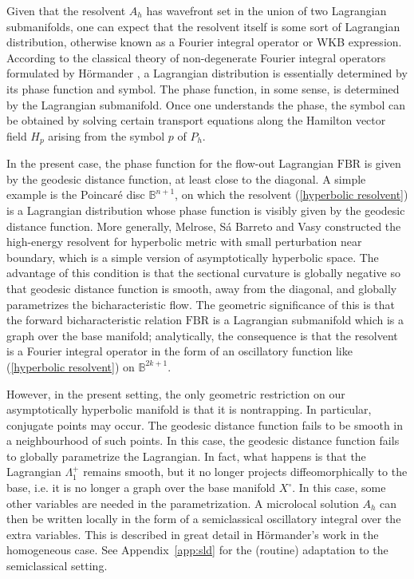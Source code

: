 \documentclass[10pt, a4paper, twoside]{amsart}
\numberwithin{equation}{section}
\theoremstyle{remark}
\begin{document}
Given that the resolvent $A_h$ has wavefront set in the union of two Lagrangian submanifolds, one can expect that the resolvent itself is some sort of Lagrangian distribution, otherwise known as a Fourier integral operator or WKB expression. According to the classical theory of non-degenerate Fourier integral operators formulated by H\"{o}rmander \cite{Hormander-Acta-1971}, a Lagrangian distribution is essentially determined by its phase function and symbol. The phase function, in some sense, is determined by the Lagrangian submanifold. Once one understands the phase, the symbol can be obtained by solving certain transport equations along the Hamilton vector field $H_p$ arising from the symbol $p$ of $P_h$.

In the present case, the phase function for the flow-out Lagrangian ${\mathrm{FBR}}$ is given by the geodesic distance function, at least close to the diagonal.  A simple example is the Poincar\'e disc $\mathbb{B}^{n + 1}$, on which the resolvent (\ref{hyperbolic resolvent}) is a Lagrangian distribution whose phase function is visibly given by the geodesic distance function. More generally, Melrose, S\'{a} Barreto and Vasy \cite{Melrose-Sa Barreto-Vasy} constructed the high-energy resolvent for hyperbolic metric with small perturbation near boundary, which is a simple version of asymptotically hyperbolic space. The advantage of this condition is that the sectional curvature is globally negative so that geodesic distance function is smooth, away from the diagonal,  and globally parametrizes the bicharacteristic flow. The geometric significance of this is that the forward bicharacteristic relation ${\mathrm{FBR}}$ is a Lagrangian submanifold which is a graph over the base manifold; analytically, the consequence is that the resolvent is a Fourier integral operator in the form of an oscillatory function like (\ref{hyperbolic resolvent}) on $\mathbb{B}^{2k + 1}$. 

However, in the present setting, the only geometric restriction on our asymptotically hyperbolic manifold is that it is nontrapping. In particular, conjugate points may occur. 
The geodesic distance function fails to be smooth in a neighbourhood of such points. In this case, the geodesic distance function fails to globally parametrize the Lagrangian. In fact, what happens is that the Lagrangian $\Lambda_1^+$ remains smooth, but it no longer projects diffeomorphically to the base, i.e. it is no longer a graph over the base manifold $X^\circ$. In this case,  some other variables are needed in the parametrization. A microlocal solution $A_h$ can then be written locally in the form of a semiclassical oscillatory integral over the extra variables. This is described in great detail in H\"ormander's work \cite{Hormander-Acta-1971} in the homogeneous case. See Appendix~\ref{app:sld} for the (routine) adaptation to the semiclassical setting. 
\end{document}
